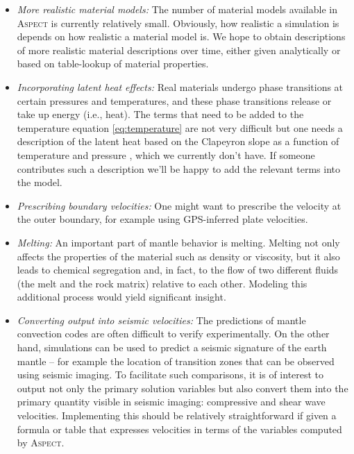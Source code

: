 \documentclass{article}
\newcommand{\aspect}{\textsc{Aspect}}
\begin{document}
\begin{itemize}
\item \textit{More realistic material models:} The number of
  material models available in \aspect{} is currently relatively
  small. Obviously, how realistic a simulation is depends on how realistic a
  material model is. We hope to obtain descriptions of more realistic material
  descriptions over time, either given analytically or based on table-lookup
  of material properties.

\item \textit{Incorporating latent heat effects:} Real materials undergo phase
  transitions at certain pressures and temperatures, and these phase
  transitions release or take up energy (i.e., heat). The terms that need to
  be added to the temperature equation \eqref{eq:temperature} are not very
  difficult but one needs a description of the latent heat based on the
  Clapeyron slope as a function of temperature and pressure \cite{CY85,STO01},
  which we currently don't have. If someone contributes such a description
  we'll be happy to add the relevant terms into the model.

\item \textit{Prescribing boundary velocities:} One might want to prescribe the
  velocity at the outer boundary, for example using GPS-inferred plate
  velocities.

\item \textit{Melting:} An important part of mantle behavior is
  melting. Melting not only affects the properties of the material such as
  density or viscosity, but it also leads to chemical segregation and, in
  fact, to the flow of two different fluids (the melt and the rock matrix)
  relative to each other. Modeling this additional process would yield
  significant insight.

\item \textit{Converting output into seismic velocities:} The predictions of
  mantle convection codes are often difficult to verify experimentally. On the
  other hand, simulations can be used to predict a seismic signature of the
  earth mantle -- for example the location of transition zones that can be
  observed using seismic imaging. To facilitate such comparisons, it is of
  interest to output not only the primary solution variables but also convert
  them into the primary quantity visible in seismic imaging: compressive and
  shear wave velocities. Implementing this should be relatively
  straightforward if given a formula or table that expresses velocities in terms of the
  variables computed by \aspect.
\end{itemize}
\end{document}
